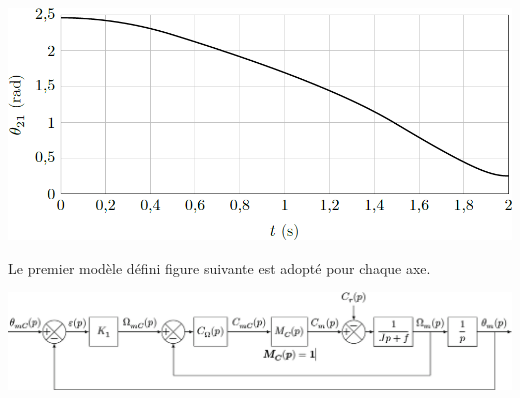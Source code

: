 \documentclass[10pt,fleqn]{article} %
\begin{document}
\begin{multicols}{2}
\begin{center}
\includegraphics[width=\linewidth]{images/fig_06}
\end{center}

Le premier modèle défini figure suivante est adopté pour chaque axe.


\begin{center}
\includegraphics[width=\linewidth]{images/fig_05}
\end{center}


\end{multicols}
\end{document}
